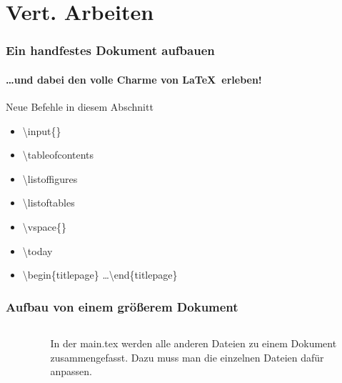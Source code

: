 \section{Vert. Arbeiten}
\begin{frame}
\frametitle{Ein handfestes Dokument aufbauen}
\framesubtitle{\ldots und dabei den volle Charme von \LaTeX ~erleben!}
\begin{block}{Neue Befehle in diesem Abschnitt}
\begin{itemize}
  \item \color{nounibaredI}\textbackslash input\color{black}\{\}
  \item \color{nounibaredI}\textbackslash tableofcontents\color{black}
  \item \color{nounibaredI}\textbackslash listoffigures\color{black}
  \item \color{nounibaredI}\textbackslash listoftables\color{black}
  \item \color{nounibaredI}\textbackslash vspace\color{black}\{\}
  \item \color{nounibaredI}\textbackslash today\color{black}
\item \color{unibablueI}\textbackslash begin\color{black}\{titlepage\} \ldots \color{unibablueI}\textbackslash end\color{black}\{titlepage\} 
\end{itemize}
\end{block}
\end{frame}

\begin{frame}
\frametitle{Aufbau von einem gr\"o\ss erem Dokument}

\begin{columns}
\begin{column}{.5\textwidth}
\footnotesize
\begin{figure}[t]
\end{figure}
\end{column}
\begin{column}{.5\textwidth}
In der main.tex werden alle anderen Dateien zu einem Dokument zusammengefasst. 
Dazu muss man die einzelnen Dateien daf\"ur anpassen.
\end{column}
\end{columns}
\end{frame}

